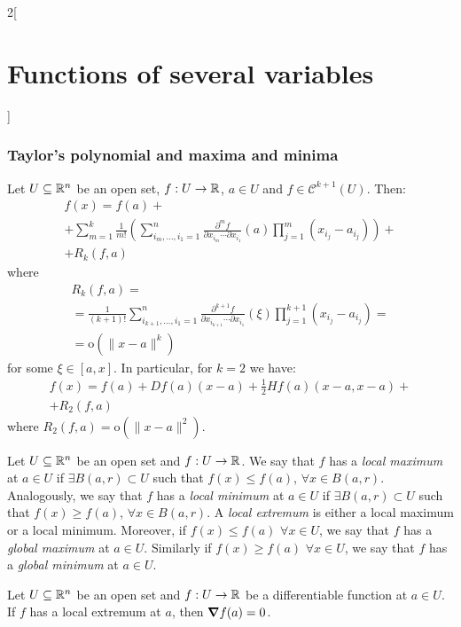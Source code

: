 \documentclass[../../../main_math.tex]{subfiles}
\begin{document}
\begin{multicols}{2}[\section{Functions of several variables}]
  \subsubsection{Taylor's polynomial and maxima and minima}
  \begin{theorem}
    Let $U\subseteq\mathbb{R}^n$ be an open set, $f:U\rightarrow\mathbb{R} $, $a\in U$ and $f\in \mathcal{C}^{k+1}(U)$. Then:
    \begin{multline*}
      f(x)=f(a)+\\+\sum_{m=1}^k\frac{1}{m!}\left(\sum_{i_m,\ldots,i_1=1}^n\frac{\partial^mf}{\partial x_{i_m}\cdots\partial x_{i_1}}(a)\prod_{j=1}^m(x_{i_j}-a_{i_j})\right)+\\+R_k(f,a)
    \end{multline*} where
    \begin{multline*}
      R_k(f,a)=\\=\frac{1}{(k+1)!}\sum_{i_{k+1},\ldots,i_1=1}^n\frac{\partial^{k+1}f}{\partial x_{i_{k+1}}\cdots\partial x_{i_1}}(\xi)\prod_{j=1}^{k+1}(x_{i_j}-a_{i_j})=\\=\text{o}(\|x-a\|^k)
    \end{multline*} for some $\xi\in[a,x]$. In particular, for $k=2$ we have:
    \begin{multline*}
      f(x)=f(a)+Df(a)(x-a)+\frac{1}{2}Hf(a)(x-a,x-a)+\\+R_2(f,a)
    \end{multline*} where $R_2(f,a)=\text{o}(\|x-a\|^2)$.
  \end{theorem}
  \begin{definition}
    Let $U\subseteq\mathbb{R}^n$ be an open set and $f:U\rightarrow\mathbb{R} $. We say that $f$ has a \emph{local maximum} at $a\in U$ if $\exists B(a,r)\subset U$ such that $f(x)\leq f(a)$, $\forall x\in B(a,r)$. Analogously, we say that $f$ has a \emph{local minimum} at $a\in U$ if $\exists B(a,r)\subset U$ such that $f(x)\geq f(a)$, $\forall x\in B(a,r)$. A \emph{local extremum} is either a local maximum or a local minimum. Moreover, if $f(x)\leq f(a)$ $\forall x\in U$, we say that $f$ has a \emph{global maximum} at $a\in U$. Similarly if $f(x)\geq f(a)$ $\forall x\in U$, we say that $f$ has a \emph{global minimum} at $a\in U$.
  \end{definition}
  \begin{proposition}
    Let $U\subseteq\mathbb{R}^n$ be an open set and $f:U\rightarrow\mathbb{R} $ be a differentiable function at $a\in U$. If $f$ has a local extremum at $a$, then $\grad f(a)=0$.
  \end{proposition}

\end{multicols}
\end{document}

